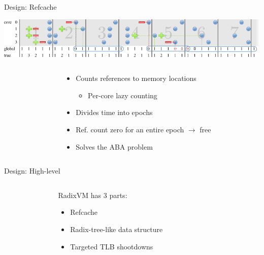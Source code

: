 \documentclass[aspectratio=169]{beamer}
\newcommand{\bi}{\begin{itemize}}
\newcommand{\ei}{\end{itemize}}
\begin{document}
\begin{frame}{Design: Refcache}
  \begin{center}
  \includegraphics[scale=0.9]{./figures/refcache.pdf}
  \end{center}
  \begin{columns}[T]
    \begin{column}{0.4\textwidth}
    \end{column}
    \begin{column}{0.6\textwidth}
      \bi
    \item Counts references to memory locations
      \bi
      \pause
    \item Per-core lazy counting
      \ei
      \pause
    \item Divides time into epochs
      \pause
    \item Ref. count zero for an entire epoch $\rightarrow$ free
      \pause
    \item Solves the ABA problem
      \ei
    \end{column}
  \end{columns}
\end{frame}

\begin{frame}{Design: High-level}
  \begin{columns}[T]
    \begin{column}{0.3\textwidth}
    \end{column}
    \begin{column}{0.4\textwidth}
      RadixVM has 3 parts:
      \bi
    \item Refcache
    \item {Radix-tree-like data structure}
    \item Targeted TLB shootdowns
      \ei
    \end{column}
    \begin{column}{0.3\textwidth}
    \end{column}
  \end{columns}
\end{frame}
\end{document}
